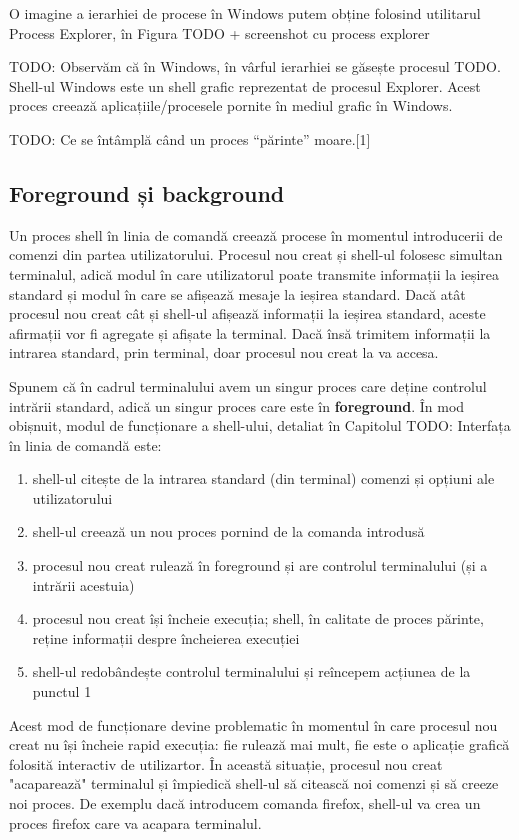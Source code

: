 O imagine a ierarhiei de procese în Windows putem obține folosind utilitarul
Process Explorer, în Figura TODO + screenshot cu process explorer

TODO: Observăm că în Windows, în vârful ierarhiei se găsește procesul TODO.
Shell-ul Windows este un shell grafic reprezentat de procesul Explorer. Acest
proces creează aplicațiile/procesele pornite în mediul grafic în Windows.

TODO: Ce se întâmplă când un proces “părinte” moare.[1]

\subsection{Foreground și background}

Un proces shell în linia de comandă creează procese în momentul introducerii de
comenzi din partea utilizatorului. Procesul nou creat și shell-ul folosesc
simultan terminalul, adică modul în care utilizatorul poate transmite informații
la ieșirea standard și modul în care se afișează mesaje la ieșirea standard.
Dacă atât procesul nou creat cât și shell-ul afișează informații la ieșirea
standard, aceste afirmații vor fi agregate și afișate la terminal. Dacă însă
trimitem informații la intrarea standard, prin terminal, doar procesul nou creat
la va accesa.

Spunem că în cadrul terminalului avem un singur proces care deține controlul
intrării standard, adică un singur proces care este în \textbf{foreground}. În mod
obișnuit, modul de funcționare a shell-ului, detaliat în Capitolul TODO:
Interfața în linia de comandă este:

\begin{enumerate}
	\item shell-ul citește de la intrarea standard (din terminal) comenzi și
		opțiuni ale utilizatorului
	\item shell-ul creează un nou proces pornind de la comanda introdusă
	\item procesul nou creat rulează în foreground și are controlul
		terminalului (și a intrării acestuia)
	\item procesul nou creat își încheie execuția; shell, în calitate de
		proces părinte, reține informații despre încheierea execuției
	\item shell-ul redobândește controlul terminalului și reîncepem acțiunea
		de la punctul 1
\end{enumerate}

Acest mod de funcționare devine problematic în momentul în care procesul nou
creat nu își încheie rapid execuția: fie rulează mai mult, fie este o aplicație
grafică folosită interactiv de utilizartor. În această situație, procesul nou
creat "acaparează" terminalul și împiedică shell-ul să citească noi comenzi și
să creeze noi proces. De exemplu dacă introducem comanda firefox, shell-ul va
crea un proces firefox care va acapara terminalul.

